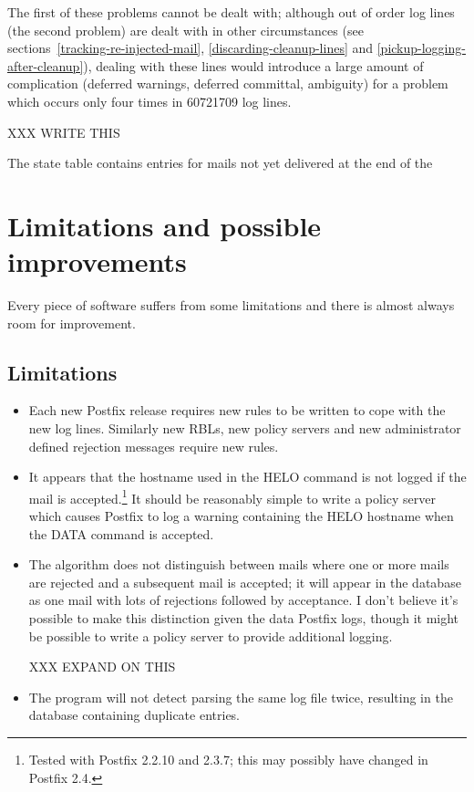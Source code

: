 \documentclass[a4paper,12pt,draft]{article}
\begin{document}
The first of these problems cannot be dealt with; although out of order log
lines (the second problem) are dealt with in other circumstances (see
sections~\ref{tracking-re-injected-mail}, \ref{discarding-cleanup-lines}
and \ref{pickup-logging-after-cleanup}), dealing with these lines would
introduce a large amount of complication (deferred warnings, deferred
committal, ambiguity) for a problem which occurs only four times in
60721709 log lines.

XXX WRITE THIS

The
state table contains entries for mails not yet delivered at the end of the 

\section{Limitations and possible improvements}

\label{limitations-improvements}

Every piece of software suffers from some limitations and there is almost
always room for improvement.

\subsection{Limitations}

\begin{itemize}

    \item Each new Postfix release requires new rules to be written to cope
        with the new log lines.  Similarly new RBLs, new policy servers and
        new administrator defined rejection messages require new rules.

    \item It appears that the hostname used in the HELO command is not
        logged if the mail is accepted.\footnote{Tested with Postfix 2.2.10
        and 2.3.7; this may possibly have changed in Postfix 2.4.}  It
        should be reasonably simple to write a policy server which causes
        Postfix to log a warning containing the HELO hostname when the DATA
        command is accepted.

    \item The algorithm does not distinguish between mails where one or
        more mails are rejected and a subsequent mail is accepted; it will
        appear in the database as one mail with lots of rejections followed
        by acceptance.  I don't believe it's possible to make this
        distinction given the data Postfix logs, though it might be
        possible to write a policy server to provide additional
        logging.

        XXX EXPAND ON THIS

    \item The program will not detect parsing the same log file twice,
        resulting in the database containing duplicate entries.

\end{itemize}
\end{document}
